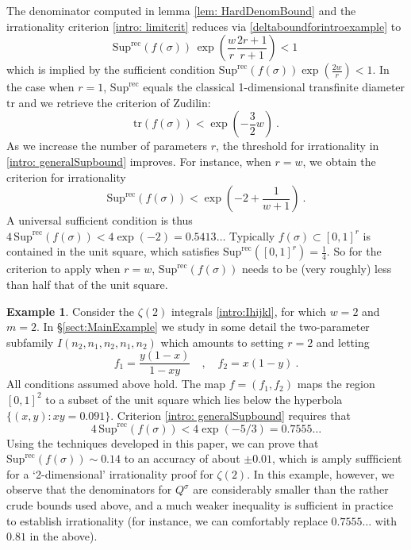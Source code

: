 \documentclass[a4paper,10pt]{amsart}
\theoremstyle{definition}
\newtheorem{example}[thm]{Example}
\theoremstyle{remark}
\numberwithin{equation}{section}
\newcommand{\rec}{\mathrm{rec}}
\newcommand{\ts}{\mathrm{Sup}}
\newcommand{\0}{\color{blue}{\mathsf{0}}}
\begin{document}
The  denominator  computed in lemma \ref{lem: HardDenomBound} and the irrationality criterion   \ref{intro: limitcrit}    reduces via \eqref{deltaboundforintroexample} to 
\begin{equation}  \label{intro: generalSupbound} 
 \ts^{\rec} ( f(\sigma)) \,  \exp \left( \frac{w}{r}  \frac{2r+1}{r+1} \right) <1 \   \end{equation}
 which is implied by the sufficient condition $  \ts^{\rec} ( f(\sigma)) \exp( \frac{2w}{r})<1$. 
 In the case when $r=1$,   $ \ts^{\rec} $ equals the classical 1-dimensional transfinite diameter $\mathrm{tr}$ and 
  we retrieve the criterion of Zudilin:
 \[  \mathrm{tr}( f(\sigma)) <   \exp \left(  -  \frac{3}{2}w \right) \ .  \] 
As we increase the number of parameters $r$, the threshold for irrationality  in \eqref{intro: generalSupbound}  improves. For instance, when  
 $r=w$, we obtain the   criterion for irrationality 
\[   \ts^{\rec} ( f(\sigma))   < \exp\left(-2 + \frac{1}{w+1}\right)\ . \] 
A universal  sufficient condition is thus $4\,   \ts^{\rec} ( f(\sigma))  <4  \exp\left(-2\right) = 0.5413\ldots$
Typically $f(\sigma) \subset [0,1]^r$ is contained in the unit square, which satisfies $\ts^{\rec}([0,1]^r)= \frac{1}{4}$. So for the  criterion to apply when $r=w$,  $\ts^{\rec}(f(\sigma))$ needs to be  (very roughly) less than  half  that of the unit square.  

\begin{example}   Consider the $\zeta(2)$ integrals  \eqref{intro:Ihijkl}, for which $w=2$ and $m=2$.  In \S\ref{sect:MainExample} we study in some detail  the two-parameter subfamily $I(n_2,n_1,n_2,n_1,n_2)$ which amounts to setting $r=2$ and letting 
\[ f_1 = \frac{y(1-x)}{1-xy} \quad , \quad f_2 = x(1-y) \ .  \]
All conditions assumed above hold. The map  $f=(f_1,f_2)$ maps the region $[0,1]^2$ to a subset of the unit square which lies below the hyperbola $\{(x,y): xy=0.091\}$. Criterion \eqref{intro: generalSupbound}
requires that 
\[ 4  \,\ts^{\rec}( f(\sigma)) < 4  \exp(-5/3) = 0.7555\ldots  \] 
Using the techniques developed in this paper, we can prove that $\ts^{\rec}( f(\sigma))\sim  0.14$ to an accuracy of about $\pm 0.01$, which is amply suffficient for a `2-dimensional'  irrationality proof for $\zeta(2)$. In this example, however, we observe that the   denominators for $Q^{\sigma}$ are considerably smaller than the rather crude  bounds used above, and a much weaker inequality is sufficient in practice to establish irrationality (for instance, we can comfortably replace $0.7555\ldots$ with $0.81$ in the above). 
 \end{example}
\end{document}
